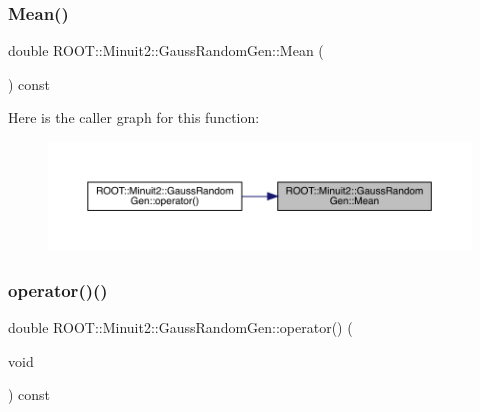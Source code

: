 \subsubsection{\texorpdfstring{Mean()}{Mean()}}
{\footnotesize\ttfamily double R\+O\+O\+T\+::\+Minuit2\+::\+Gauss\+Random\+Gen\+::\+Mean (\begin{DoxyParamCaption}{ }\end{DoxyParamCaption}) const\hspace{0.3cm}{\ttfamily [inline]}}

Here is the caller graph for this function\+:\nopagebreak
\begin{figure}[H]
\begin{center}
\leavevmode
\includegraphics[width=350pt]{d8/dd8/classROOT_1_1Minuit2_1_1GaussRandomGen_af0c44fa97654765f21d85891ef141e2d_icgraph}
\end{center}
\end{figure}
\mbox{\label{classROOT_1_1Minuit2_1_1GaussRandomGen_aaefcd8e04b3388314c9f14932a17a163}} 
\subsubsection{\texorpdfstring{operator()()}{operator()()}}
{\footnotesize\ttfamily double R\+O\+O\+T\+::\+Minuit2\+::\+Gauss\+Random\+Gen\+::operator() (\begin{DoxyParamCaption}\item[{void}]{ }\end{DoxyParamCaption}) const\hspace{0.3cm}{\ttfamily [inline]}}

